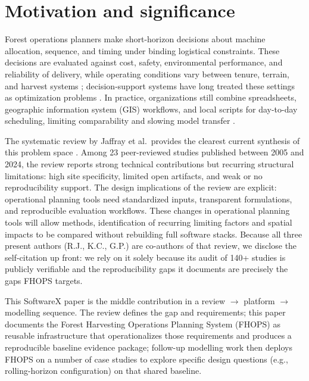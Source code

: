 \section{Motivation and significance}
\label{sec:introduction}

Forest operations planners make short-horizon decisions about machine allocation,
sequence, and timing under binding logistical constraints. These decisions are evaluated against cost, safety, environmental performance, and reliability of delivery, while operating conditions vary between tenure, terrain, and harvest systems
\cite{henkelman1978gpssv,weintraub1996new,heinimann2007forest};
decision-support systems have long treated these settings as optimization problems
\cite{buongiorno2003decision,kangas2008decision}.
In practice, organizations still combine spreadsheets, geographic information system (GIS) workflows, and local scripts for day-to-day scheduling,  limiting comparability and slowing model transfer
\cite{ulvdal2022uncertainty,nelson2003forestmodels}.

The systematic review by Jaffray et al.~provides the clearest current synthesis of this problem space \cite{jaffray2026systematic}. Among 23 peer-reviewed studies published between 2005 and 2024, the review reports strong technical contributions but recurring structural limitations: high site specificity, limited open artifacts, and weak or no reproducibility support. The design implications of the review are explicit: operational planning tools need standardized inputs, transparent formulations, and reproducible evaluation workflows. These changes in operational planning tools will allow methods, identification of recurring limiting factors and spatial impacts to be compared without rebuilding full software stacks. Because all three present authors (R.J., K.C., G.P.) are co-authors of that review, we disclose the self-citation up front: we rely on it solely because its audit of 140+ studies is publicly verifiable and the reproducibility gaps it documents are precisely the gaps FHOPS targets.

This SoftwareX paper is the middle contribution in a review $\rightarrow$ platform $\rightarrow$ modelling sequence. The review defines the gap and requirements; this paper documents the Forest Harvesting Operations Planning System (FHOPS) as reusable infrastructure that operationalizes those requirements and produces a reproducible baseline evidence package; follow-up modelling work then deploys FHOPS on a number of case studies to explore specific design questions (e.g., rolling-horizon configuration) on that shared baseline.

